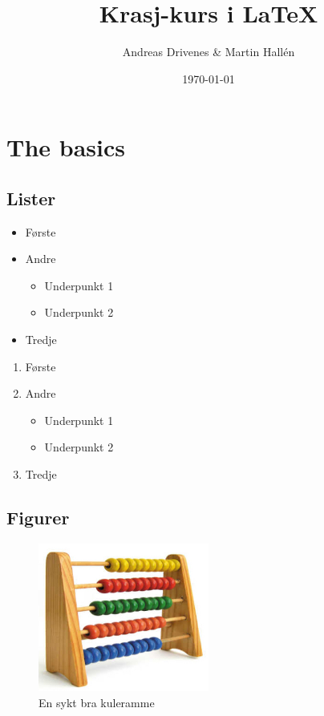 \documentclass[a4paper]{article}
\begin{document}
\title{Krasj-kurs i \LaTeX}
\author{Andreas Drivenes \& Martin Hallén}
\date{\today}

\maketitle

\begin{abstract}
    \blindtext
\end{abstract}

\section{The basics}

\blindtext

\subsection{Lister}

\begin{itemize}
    \item Første
    \item Andre
    \begin{itemize}
        \item Underpunkt 1
        \item Underpunkt 2
    \end{itemize}
    \item Tredje
\end{itemize}

\begin{enumerate}
    \item Første
    \item Andre
    \begin{itemize}
        \item Underpunkt 1
        \item Underpunkt 2
    \end{itemize}
    \item Tredje
\end{enumerate}

\subsection{Figurer}

\begin{figure}[h]
    \centering
    \includegraphics[width=0.5\textwidth]{kuleramme}
    \caption{En sykt bra kuleramme}
    \label{fig:kuleramme}
\end{figure}
\end{document}
